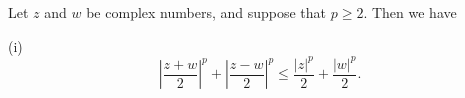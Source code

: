Let $z$ and $w$ be complex numbers, and suppose that $p \geq 2$. Then we have

(i) $$\left| \frac{z+w}{2} \right|^p + \left| \frac{z-w}{2} \right|^p \leq \frac{|z|^p}{2} + \frac{|w|^p}{2}.$$